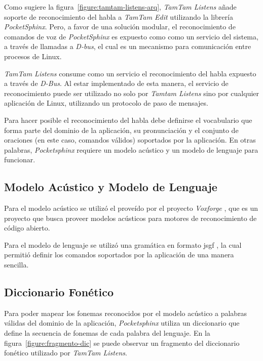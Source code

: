 Como sugiere la figura~\ref{figure:tamtam-listens-arq}, \emph{TamTam Listens} a\~nade soporte de reconocimiento
del habla a \emph{TamTam Edit} utilizando la librer\'ia \emph{PocketSphinx}. Pero, a favor de una soluci\'on modular,
el reconocimiento de comandos de voz de \emph{PocketSphinx} es expuesto como 
como un  servicio del sistema, a trav\'es de llamadas a \emph{D-bus}\cite{Dbus2013}, el cual es
un mecanismo para comunicaci\'on entre procesos de Linux.

\emph{TamTam Listens} consume como un servicio el reconocimiento del habla expuesto a trav\'es de \emph{D-Bus}. Al estar implementado de esta manera, el
servicio de reconocimiento puede ser utilizado no solo por \emph{Tamtam Listens} sino por cualquier aplicaci\'on 
de Linux, utilizando un protocolo de paso de mensajes. 

Para hacer posible el reconocimiento del habla debe definirse el vocabulario que forma parte del dominio de 
la aplicaci\'on, su pronunciaci\'on y el conjunto de oraciones (en este caso, comandos v\'alidos) soportados por la aplicaci\'on.
En otras palabras, \emph{Pocketsphinx} requiere un modelo ac\'ustico y un modelo de lenguaje para funcionar.

\subsection{Modelo Ac\'ustico y Modelo de Lenguaje}

Para el modelo ac\'ustico se utiliz\'o el prove\'ido por el proyecto \emph{Voxforge}
\cite{Voxforge}, que es un proyecto que busca proveer modelos ac\'usticos para motores de reconocimiento
de c\'odigo abierto.

Para el modelo de lenguaje se utiliz\'o una gram\'atica en formato \gls{jsgf} 
\cite{JSGF2000}, la cual permiti\'o definir los comandos soportados por la aplicaci\'on de una manera sencilla. 

\subsection{Diccionario Fon\'etico}

Para poder mapear los fonemas reconocidos por el modelo ac\'ustico a palabras v\'alidas del dominio de la 
aplicaci\'on, \emph{Pocketsphinx} utiliza un diccionario que define la secuencia de fonemas de cada palabra 
del lenguaje. En la figura~\ref{figure:fragmento-dic} se puede observar un fragmento del diccionario fon\'etico
utilizado por \emph{TamTam Listens}.


